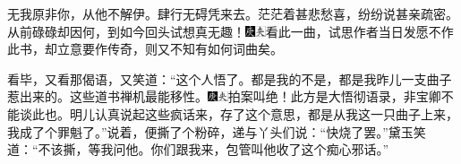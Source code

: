 无我原非你，从他不解伊。肆行无碍凭来去。茫茫着甚悲愁喜，纷纷说甚亲疏密。从前碌碌却因何，{到如今}回头试想真无趣！{\includegraphics[width=3mm]{../Images/00004}\includegraphics[width=3mm]{../Images/00012}\footnotesize \kaishu 看此一曲，试思作者当日发愿不作此书，却立意要作传奇，则又不知有如何词曲矣。}

看毕，又看那偈语，又笑道：``这个人悟了。都是我的不是，都是我昨儿一支曲子惹出来的。这些道书禅机最能移性。{\includegraphics[width=3mm]{../Images/00004}\includegraphics[width=3mm]{../Images/00012}\footnotesize \kaishu 拍案叫绝！此方是大悟彻语录，非宝卿不能谈此也。}明儿认真说起这些疯话来，存了这个意思，都是从我这一只曲子上来，我成了个罪魁了。''说着，便撕了个粉碎，递与丫头们说：``快烧了罢。''黛玉笑道：``不该撕，等我问他。你们跟我来，包管叫他收了这个痴心邪话。''

